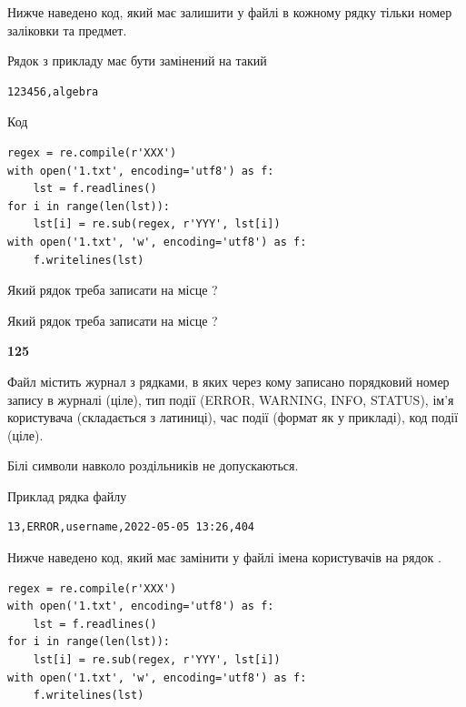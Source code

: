 Нижче наведено код, який має залишити у файлі в кожному рядку тільки номер заліковки та предмет.

Рядок з прикладу має бути замінений на такий



\begin{verbatim}
123456,algebra
\end{verbatim}




Код



\begin{verbatim}
regex = re.compile(r'XXX')
with open('1.txt', encoding='utf8') as f:
    lst = f.readlines()
for i in range(len(lst)):
    lst[i] = re.sub(regex, r'YYY', lst[i])
with open('1.txt', 'w', encoding='utf8') as f:
    f.writelines(lst)
\end{verbatim}









Який рядок треба записати на місце  ?\par
\vspace{5mm}


Який рядок треба записати на місце  ?\par


\newpage

{\begin {center}\textbf{ 125}\end {center}}\par
Файл  містить журнал з рядками, в яких через кому записано поряд\-ко\-вий номер запису в журналі (ціле), тип події (ERROR, WARNING, INFO, STATUS), ім'я користувача (складається з латиниці), час події (фор\-мат як у прикладі), код події (ціле).

Білі символи навколо роздільників не допускаються.

Приклад рядка файлу



\begin{verbatim}
13,ERROR,username,2022-05-05 13:26,404
\end{verbatim}


Нижче наведено код, який має замінити у файлі імена користувачів на рядок .



\begin{verbatim}
regex = re.compile(r'XXX')
with open('1.txt', encoding='utf8') as f:
    lst = f.readlines()
for i in range(len(lst)):
    lst[i] = re.sub(regex, r'YYY', lst[i])
with open('1.txt', 'w', encoding='utf8') as f:
    f.writelines(lst)
\end{verbatim}







